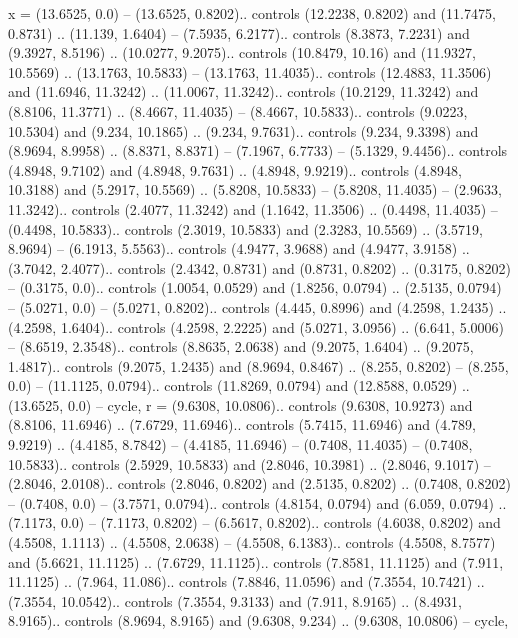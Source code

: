{x} = {(13.6525, 0.0) -- (13.6525, 0.8202).. controls (12.2238, 0.8202) and (11.7475, 0.8731) .. (11.139, 1.6404) -- (7.5935, 6.2177).. controls (8.3873, 7.2231) and (9.3927, 8.5196) .. (10.0277, 9.2075).. controls (10.8479, 10.16) and (11.9327, 10.5569) .. (13.1763, 10.5833) -- (13.1763, 11.4035).. controls (12.4883, 11.3506) and (11.6946, 11.3242) .. (11.0067, 11.3242).. controls (10.2129, 11.3242) and (8.8106, 11.3771) .. (8.4667, 11.4035) -- (8.4667, 10.5833).. controls (9.0223, 10.5304) and (9.234, 10.1865) .. (9.234, 9.7631).. controls (9.234, 9.3398) and (8.9694, 8.9958) .. (8.8371, 8.8371) -- (7.1967, 6.7733) -- (5.1329, 9.4456).. controls (4.8948, 9.7102) and (4.8948, 9.7631) .. (4.8948, 9.9219).. controls (4.8948, 10.3188) and (5.2917, 10.5569) .. (5.8208, 10.5833) -- (5.8208, 11.4035) -- (2.9633, 11.3242).. controls (2.4077, 11.3242) and (1.1642, 11.3506) .. (0.4498, 11.4035) -- (0.4498, 10.5833).. controls (2.3019, 10.5833) and (2.3283, 10.5569) .. (3.5719, 8.9694) -- (6.1913, 5.5563).. controls (4.9477, 3.9688) and (4.9477, 3.9158) .. (3.7042, 2.4077).. controls (2.4342, 0.8731) and (0.8731, 0.8202) .. (0.3175, 0.8202) -- (0.3175, 0.0).. controls (1.0054, 0.0529) and (1.8256, 0.0794) .. (2.5135, 0.0794) -- (5.0271, 0.0) -- (5.0271, 0.8202).. controls (4.445, 0.8996) and (4.2598, 1.2435) .. (4.2598, 1.6404).. controls (4.2598, 2.2225) and (5.0271, 3.0956) .. (6.641, 5.0006) -- (8.6519, 2.3548).. controls (8.8635, 2.0638) and (9.2075, 1.6404) .. (9.2075, 1.4817).. controls (9.2075, 1.2435) and (8.9694, 0.8467) .. (8.255, 0.8202) -- (8.255, 0.0) -- (11.1125, 0.0794).. controls (11.8269, 0.0794) and (12.8588, 0.0529) .. (13.6525, 0.0) -- cycle},
{r} = {(9.6308, 10.0806).. controls (9.6308, 10.9273) and (8.8106, 11.6946) .. (7.6729, 11.6946).. controls (5.7415, 11.6946) and (4.789, 9.9219) .. (4.4185, 8.7842) -- (4.4185, 11.6946) -- (0.7408, 11.4035) -- (0.7408, 10.5833).. controls (2.5929, 10.5833) and (2.8046, 10.3981) .. (2.8046, 9.1017) -- (2.8046, 2.0108).. controls (2.8046, 0.8202) and (2.5135, 0.8202) .. (0.7408, 0.8202) -- (0.7408, 0.0) -- (3.7571, 0.0794).. controls (4.8154, 0.0794) and (6.059, 0.0794) .. (7.1173, 0.0) -- (7.1173, 0.8202) -- (6.5617, 0.8202).. controls (4.6038, 0.8202) and (4.5508, 1.1113) .. (4.5508, 2.0638) -- (4.5508, 6.1383).. controls (4.5508, 8.7577) and (5.6621, 11.1125) .. (7.6729, 11.1125).. controls (7.8581, 11.1125) and (7.911, 11.1125) .. (7.964, 11.086).. controls (7.8846, 11.0596) and (7.3554, 10.7421) .. (7.3554, 10.0542).. controls (7.3554, 9.3133) and (7.911, 8.9165) .. (8.4931, 8.9165).. controls (8.9694, 8.9165) and (9.6308, 9.234) .. (9.6308, 10.0806) -- cycle},
